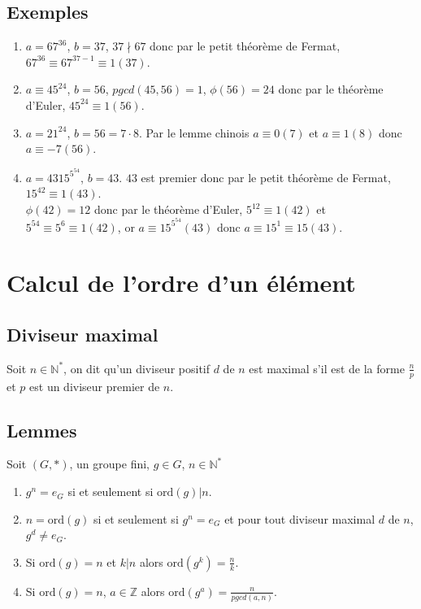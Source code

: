 \documentclass[a4paper,10pt]{book} %
\newcommand{\N}{\mathbb{N}}
\newcommand{\Z}{\mathbb{Z}}
\newcommand{\ord}{\mathrm{ord}}
\begin{document}
\subsection{Exemples}
\begin{enumerate}
\item $a=67^{36}$, $b=37$, $37 \nmid 67$ donc par le petit théorème de Fermat, $67^{36}\equiv 67^{37-1}\equiv 1(37)$.

\item $a\equiv 45^{24}$, $b=56$, $pgcd(45,56)=1$, $\phi(56)=24$ donc par le théorème d'Euler, $45^24\equiv 1(56)$.

\item $a=21^{24}$, $b=56=7\cdot 8$. Par le lemme chinois $a\equiv 0(7)$ et $a\equiv 1(8)$ donc $a\equiv -7(56)$.

\item $a=4315^{5^{54}}$, $b=43$. $43$ est premier donc par le petit théorème de Fermat, $15^{42}\equiv 1(43)$.\\
$\phi(42)=12$ donc par le théorème d'Euler, $5^{12}\equiv 1(42)$ et $5^{54}\equiv 5^6\equiv 1(42)$, or $a\equiv 15^{5^{54}}(43)$ donc $a\equiv 15^{1}\equiv 15(43)$.
\end{enumerate}

\section{Calcul de l'ordre d'un élément}
\subsection{Diviseur maximal}
Soit $n\in \N^*$, on dit qu'un diviseur positif $d$ de $n$ est maximal s'il est de la forme $\frac{n}{p}$ et $p$ est un diviseur premier de $n$.

\subsection{Lemmes}
Soit $(G,*)$, un groupe fini, $g\in G$, $n\in \N^*$
\begin{enumerate}
\item \label{lemme1}$g^n=e_G$ si et seulement si $\ord(g) | n$.
\item \label{lemme2}$n=\ord(g)$ si et seulement si $g^n=e_G$ et pour tout diviseur maximal $d$ de $n$, $g^d\neq e_G$.
\item \label{lemme3}Si $\ord(g)=n$ et $k|n$ alors $\ord(g^k)=\frac{n}{k}$.
\item \label{lemme4}Si $\ord(g)=n$, $a\in\Z$ alors $\ord(g^a)=\frac{n}{pgcd(a,n)}$.
\end{enumerate}
\end{document}
